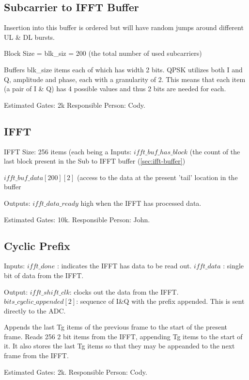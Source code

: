\documentclass[10pt]{article}
\begin{document}
	\subsection{Subcarrier to IFFT Buffer}
	\label{sec:ifft-buffer}
	Insertion into this buffer is ordered but will have random jumps around
	different UL \& DL bursts.

	Block Size = blk\_siz = 200 (the total number of used subcarriers)
	
	Buffers blk\_size items each of which has
	width 2 bits. QPSK utilizes both I and Q, amplitude and phase, each with a
	granularity of 2. This means that each item (a pair of I \& Q) has 4
	possible values and thus 2 bits are needed for each.

	Estimated Gates: 2k
	Responsible Person: Cody.

	\subsection{IFFT}
	\label{sec:ifft}
	IFFT Size: 256 items (each being a 
	Inputs: 
		$ifft\_buf\_has\_block$ (the count of the last block
		present in the Sub to IFFT buffer (\autoref{sec:ifft-buffer})
		
		$ifft\_buf\_data[200][2]$ (access to the data at the present 'tail' location
		in the buffer
	
	Outputs:
		$ifft\_data\_ready$ high when the IFFT has processed data.

	Estimated Gates: 10k.
	Responsible Person: John.

	\subsection{Cyclic Prefix}
	\label{sec:cyclic_prefix}

	Inputs:
		$ifft\_done$ : indicates the IFFT has data to be read out.
		$ifft\_data$ : single bit of data from the IFFT.

	Output:
		$ifft\_shift\_clk$: clocks out the data from the IFFT.
		$bits\_cyclic\_appended[2]$: sequence of I\&Q with the prefix appended.
			This is sent directly to the ADC.


	Appends the last Tg items of the previous frame to the start of the
	present frame.  Reads 256 2 bit items from the IFFT, appending Tg items
	to the start of it. It also stores the last Tg items so that they may
	be appeanded to the next frame from the IFFT.

	Estimated Gates: 2k.
	Responsible Person: Cody.
\end{document}
